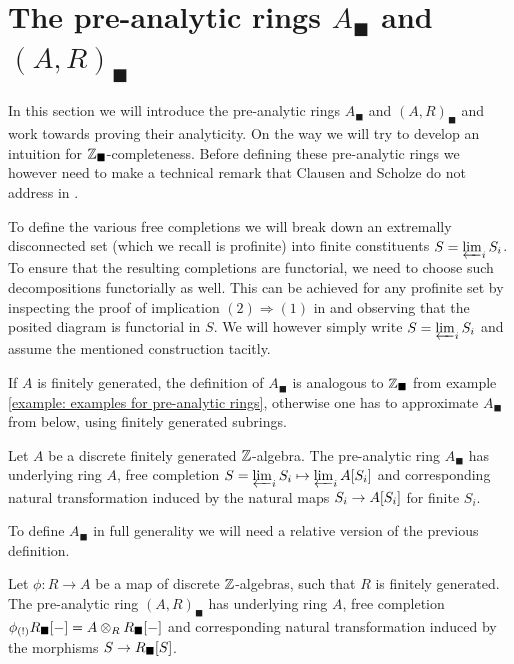 
\newpage
\section{\texorpdfstring{The pre-analytic rings $A_\blacksquare$ and $(A, R)_\blacksquare$}{Solid Rings}}
\label{section: the pre-analytic rings Ablack and (A,R)black}

In this section we will introduce the pre-analytic rings $A_\blacksquare$ and $(A, R)_\blacksquare$ and work towards proving their analyticity. On the way we will try to develop an intuition for ${\mathbb{Z}}_\blacksquare$-completeness. Before defining these pre-analytic rings we however need to make a technical remark that Clausen and Scholze do not address in \cite{condenseddotpdf}.
\begin{remark}
	To define the various free completions we will break down an extremally disconnected set (which we recall is profinite) into finite constituents $S = \varprojlim_i S_i$. To ensure that the resulting completions are functorial, we need to choose such decompositions functorially as well. This can be achieved for any profinite set by inspecting the proof of implication $(2)\Rightarrow (1)$ in \cite[\href{https://stacks.math.columbia.edu/tag/08ZY}{Tag 08ZY}]{stacks-project} and observing that the posited diagram is functorial in $S$. We will however simply write $S=\varprojlim_i S_i$ and assume the mentioned construction tacitly.
\end{remark}

If $A$ is finitely generated, the definition of $A_\blacksquare$ is analogous to ${\mathbb{Z}}_\blacksquare$ from example \ref{example: examples for pre-analytic rings}, otherwise one has to approximate $A_\blacksquare$ from below, using finitely generated subrings. 
\begin{definition}
	\label{definition: the pre-analytic ring Ablack for finitely generated A}
	
	Let $A$ be a discrete finitely generated ${\mathbb{Z}}$-algebra. The pre-analytic ring $A_\blacksquare$ has underlying ring $A$, free completion $S=\varprojlim_i S_i \mapsto \varprojlim_i {A[S_i]}$ and corresponding natural transformation induced by the natural maps $S_i\to {A[S_i]}$ for finite $S_i$.
\end{definition}

To define $A_\blacksquare$ in full generality we will need a relative version of the previous definition.
\begin{definition}
	Let $\phi\colon R\to A$ be a map of discrete ${\mathbb{Z}}$-algebras, such that $R$ is finitely generated. The pre-analytic ring $(A, R)_\blacksquare$ has underlying ring $A$, free completion ${\phi_{(!)}}{R_\blacksquare[-]} = A\otimes_R {R_\blacksquare[-]}$ and corresponding natural transformation induced by the morphisms $S\to {R_\blacksquare[S]}$.
\end{definition}

